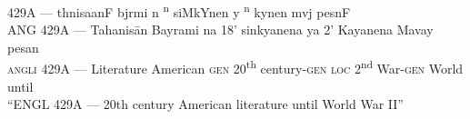 \documentclass[12pt,paper=letter]{scrartcl}
\newcommand{\tsup}[1]{\textsuperscript{#1}} %
\newcommand{\mor}[1]{\textsc{\lowercase{#1}}}
\newcommand{\ayr}[1]{{\Tagati #1}}
\begin{document}

\begin{exe}
    \ex
    \glll \ayr{AN} \ayr{429A} \ayr{—} \ayr{thnisaanF} \ayr{bjrmi} \ayr{n} \ayr{18\tsup{n}} \ayr{siMkYnen} \ayr{y} \ayr{2\tsup{n}} \ayr{kynen} \ayr{mvj} \ayr{pesnF}\\
    ANG 429A — Tahanisān Bayrami na 18’ sinkyanena ya 2’ Kayanena Mavay pesan \\
    \mor{ANGLI} 429A — Literature American \mor{GEN} 20\tsup{th} century-\mor{GEN} \mor{LOC} 2\tsup{nd} War-\mor{GEN} World until \\
    \glt “ENGL 429A — 20th century American literature until World War II”
\end{exe}

\end{document}
